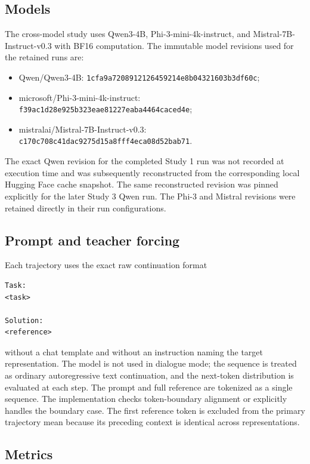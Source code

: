 \documentclass[sn-mathphys-num]{sn-jnl}
\begin{document}
\subsection{Models}

The cross-model study uses Qwen3-4B, Phi-3-mini-4k-instruct, and Mistral-7B-Instruct-v0.3 with BF16 computation. The immutable model revisions used for the retained runs are:

\begin{itemize}
\item Qwen/Qwen3-4B: \texttt{1cfa9a7208912126459214e8b04321603b3df60c};
\item microsoft/Phi-3-mini-4k-instruct: \texttt{f39ac1d28e925b323eae81227eaba4464caced4e};
\item mistralai/Mistral-7B-Instruct-v0.3: \texttt{c170c708c41dac9275d15a8fff4eca08d52bab71}.
\end{itemize}

The exact Qwen revision for the completed Study 1 run was not recorded at execution time and was subsequently reconstructed from the corresponding local Hugging Face cache snapshot. The same reconstructed revision was pinned explicitly for the later Study 3 Qwen run. The Phi-3 and Mistral revisions were retained directly in their run configurations.

\subsection{Prompt and teacher forcing}

Each trajectory uses the exact raw continuation format

\begin{verbatim}
Task:
<task>

Solution:
<reference>
\end{verbatim}

without a chat template and without an instruction naming the target representation. The model is not used in dialogue mode; the sequence is treated as ordinary autoregressive text continuation, and the next-token distribution is evaluated at each step. The prompt and full reference are tokenized as a single sequence. The implementation checks token-boundary alignment or explicitly handles the boundary case. The first reference token is excluded from the primary trajectory mean because its preceding context is identical across representations.

\subsection{Metrics}
\end{document}
